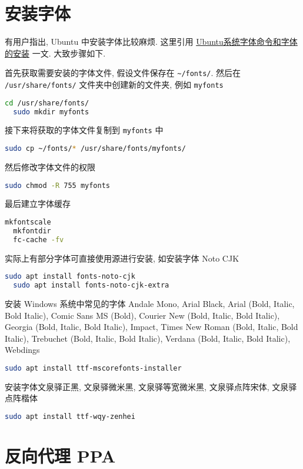 \section{安装字体}\label{sec:addition:font}

有用户指出,
Ubuntu 中安装字体比较麻烦.
这里引用
\href{https://www.jianshu.com/p/e7f12b8c8602}{Ubuntu系统字体命令和字体的安装}
一文.
大致步骤如下.

首先获取需要安装的字体文件,
假设文件保存在 \verb|~/fonts/|.
然后在 \texttt{/usr/share/fonts/} 文件夹中创建新的文件夹,
例如 \texttt{myfonts}
\begin{lstlisting}[language=bash]
  cd /usr/share/fonts/
  sudo mkdir myfonts
\end{lstlisting}
接下来将获取的字体文件复制到 \texttt{myfonts} 中
\begin{lstlisting}[language=bash]
  sudo cp ~/fonts/* /usr/share/fonts/myfonts/ 
\end{lstlisting}
然后修改字体文件的权限
\begin{lstlisting}[language=bash]
  sudo chmod -R 755 myfonts
\end{lstlisting}
最后建立字体缓存
\begin{lstlisting}[language=bash]
  mkfontscale
  mkfontdir
  fc-cache -fv
\end{lstlisting}

实际上有部分字体可直接使用源进行安装,
如安装字体 Noto CJK
\begin{lstlisting}[language=bash]
  sudo apt install fonts-noto-cjk
  sudo apt install fonts-noto-cjk-extra
\end{lstlisting}
安装 Windows 系统中常见的字体 Andale Mono,
Arial Black,
Arial (Bold, Italic, Bold Italic),
Comic Sans MS (Bold),
Courier New (Bold, Italic, Bold Italic),
Georgia (Bold, Italic, Bold Italic),
Impact,
Times New Roman (Bold, Italic, Bold Italic),
Trebuchet (Bold, Italic, Bold Italic),
Verdana (Bold, Italic, Bold Italic),
Webdings
\begin{lstlisting}[language=bash]
  sudo apt install ttf-mscorefonts-installer
\end{lstlisting}
安装字体文泉驿正黑,
文泉驿微米黑,
文泉驿等宽微米黑,
文泉驿点阵宋体,
文泉驿点阵楷体
\begin{lstlisting}[language=bash]
  sudo apt install ttf-wqy-zenhei
\end{lstlisting}

\section{反向代理 PPA}\label{sec:addition:proxy}

